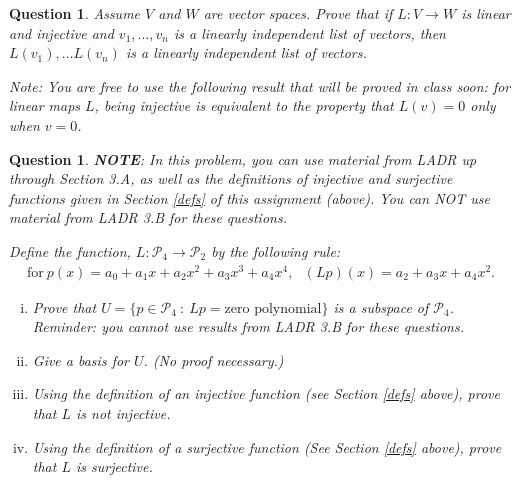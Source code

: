 \documentclass[12pt]{article}
\newtheorem{question}[thm]{Question}
\def\P{\mathcal P}
\begin{document}
\begin{question}
	\normalfont
	
Assume $V$ and $W$ are vector spaces. Prove that if $L:V\to W$ is linear and injective and \hspace{.1cm} $v_1,\dots, v_n$ \hspace{.1cm} is a linearly independent list of vectors, then \hspace{.1cm} $L(v_1),\dots L(v_n)$  \hspace{.1cm} is a linearly independent list of vectors.
	
	
\noindent \emph{Note: You are free to use the following result that will be proved in class soon: for linear maps $L$, being injective is equivalent to the property that $L(v)=0$ only when $v=0$.}

\end{question}

\vspace{.5cm}


\begin{question} \noindent \textbf{NOTE}: In this problem, you can use material from LADR up through Section 3.A, as well as the definitions of injective and surjective functions given in Section \ref{defs} of this assignment (above). You can NOT use material from LADR 3.B for these questions. \\

	\normalfont
	
	Define the function, $L:\P_4\to \P_2$ by the following rule:
	\begin{align*}
		\text{for}\ p(x) = a_0 + a_1x + a_2x^2 + a_3x^3 + a_4 x^4,\ \ \ 
		(Lp)(x) = a_2 + a_3 x + a_4 x^2. 
	\end{align*}

	
	\begin{enumerate}[(i)]
		
		\item Prove that $U=\{p\in\P_4\ :\ Lp = \text{zero polynomial}\}$ is a subspace of $\P_4$. \\
		\emph{Reminder: you cannot use results from LADR 3.B for these questions.}
		
		\item Give a basis for $U$. (No proof necessary.)
		
		\item Using the definition of an injective function (see Section \ref{defs} above), prove that $L$ is not injective.  
				
		\item Using the definition of a surjective function (See Section \ref{defs} above), prove that $L$ is surjective.  
	\end{enumerate}
\end{question}
\end{document}
